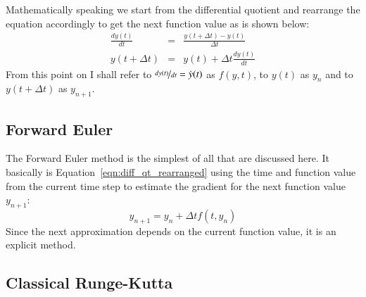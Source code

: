 \documentclass{aa}
\begin{document}
Mathematically speaking we start from the differential quotient and rearrange the equation
accordingly to get the next function value as is shown below:
\begin{eqnarray}
    \label{eqn:differential_quotiont}
    \frac{dy(t)}{dt} & = & \frac{y(t+\Delta t) - y(t)}{\Delta t}\\
    y(t + \Delta t) & = & y(t) + \Delta t \frac{dy(t)}{dt} \label{eqn:diff_qt_rearranged}
\end{eqnarray}
From this point on I shall refer to \(\nicefrac{dy(t)}{dt} = \dot{y}(t)\) as \(f(y,t)\), to
\(y(t)\) as \(y_n\) and to \(y(t + \Delta t)\) as \(y_{n+1}\).

\subsection{Forward Euler}%
\label{sub:forward_euler}
The Forward Euler method is the simplest of all that are discussed here. It basically is
Equation~\ref{eqn:diff_qt_rearranged} using the time and function value from the current
time step to estimate the gradient for the next function value \(y_{n+1}\):
\begin{equation}
    \label{eqn:forward_euler}
    y_{n+1} = y_n + \Delta t f(t, y_n)
\end{equation}
Since the next approximation depends on the current function value, it is an explicit method.

\subsection{Classical Runge-Kutta}%
\label{sub:classical_runge_kutta}
\end{document}
